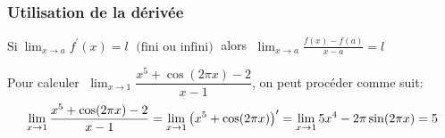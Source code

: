       \subsubsection*{Utilisation de la dérivée}
     \begin{theorem}
           $ \text{Si} \;\displaystyle\lim_{x \to a}{f^{\prime}(x)} =l\; \text{ (fini ou infini)}\;$   alors $  \; \displaystyle\lim_{x \to a}{\frac{f(x)-f(a)}{x-a}} =l$
            \end{theorem}
            \begin{example}
            Pour calculer   $  \;\displaystyle\lim_{x \to 1}{\dfrac{x^5+\cos(2\pi x) -2}{x-1}} $, on peut procéder comme suit:
            \[\displaystyle\lim_{x \to 1}{\dfrac{x^5+\cos(2\pi x) -2}{x-1}}=\displaystyle\lim_{x \to 1}{\left(x^5+\cos(2\pi x)\right)^{\prime}}=\displaystyle\lim_{x \to 1}{5x^{4}-2\pi\sin(2\pi x)}=5\]
            \end{example}
